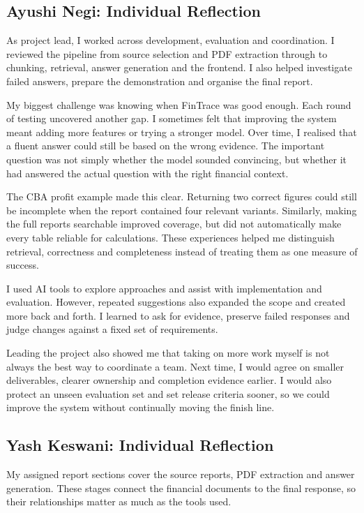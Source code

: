 
\subsection{Ayushi Negi: Individual Reflection}
As project lead, I worked across development, evaluation and coordination. I reviewed the pipeline from source selection and PDF extraction through to chunking, retrieval, answer generation and the frontend. I also helped investigate failed answers, prepare the demonstration and organise the final report.

My biggest challenge was knowing when FinTrace was good enough. Each round of testing uncovered another gap. I sometimes felt that improving the system meant adding more features or trying a stronger model. Over time, I realised that a fluent answer could still be based on the wrong evidence. The important question was not simply whether the model sounded convincing, but whether it had answered the actual question with the right financial context.

The CBA profit example made this clear. Returning two correct figures could still be incomplete when the report contained four relevant variants. Similarly, making the full reports searchable improved coverage, but did not automatically make every table reliable for calculations. These experiences helped me distinguish retrieval, correctness and completeness instead of treating them as one measure of success.

I used AI tools to explore approaches and assist with implementation and evaluation. However, repeated suggestions also expanded the scope and created more back and forth. I learned to ask for evidence, preserve failed responses and judge changes against a fixed set of requirements.

Leading the project also showed me that taking on more work myself is not always the best way to coordinate a team. Next time, I would agree on smaller deliverables, clearer ownership and completion evidence earlier. I would also protect an unseen evaluation set and set release criteria sooner, so we could improve the system without continually moving the finish line.

\subsection{Yash Keswani: Individual Reflection}
My assigned report sections cover the source reports, PDF extraction and answer generation. These stages connect the financial documents to the final response, so their relationships matter as much as the tools used.


